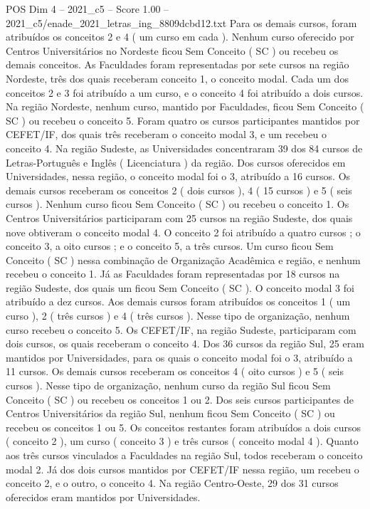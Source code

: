 \begin{textsample}{POS Dim 4 – 2021\_c5 – Score 1.00 – 2021\_c5/enade\_2021\_letras\_ing\_8809dcbd12.txt}
Para os demais cursos, foram atribuídos os conceitos 2 e 4 ( um curso em cada ).
Nenhum curso oferecido por Centros Universitários no Nordeste ficou Sem Conceito ( SC ) ou recebeu os demais conceitos.
As Faculdades foram representadas por sete cursos na região Nordeste, três dos quais receberam conceito 1, o conceito modal.
Cada um dos conceitos 2 e 3 foi atribuído a um curso, e o conceito 4 foi atribuído a dois cursos.
Na região Nordeste, nenhum curso, mantido por Faculdades, ficou Sem Conceito ( SC ) ou recebeu o conceito 5.
Foram quatro os cursos participantes mantidos por CEFET/IF, dos quais três receberam o conceito modal 3, e um recebeu o conceito 4.
Na região Sudeste, as Universidades concentraram 39 dos 84 cursos de Letras-Português e Inglês ( Licenciatura ) da região.
Dos cursos oferecidos em Universidades, nessa região, o conceito modal foi o 3, atribuído a 16 cursos.
Os demais cursos receberam os conceitos 2 ( dois cursos ), 4 ( 15 cursos ) e 5 ( seis cursos ).
Nenhum curso ficou Sem Conceito ( SC ) ou recebeu o conceito 1.
Os Centros Universitários participaram com 25 cursos na região Sudeste, dos quais nove obtiveram o conceito modal 4.
O conceito 2 foi atribuído a quatro cursos ; o conceito 3, a oito cursos ; e o conceito 5, a três cursos.
Um curso ficou Sem Conceito ( SC ) nessa combinação de Organização Acadêmica e região, e nenhum recebeu o conceito 1.
Já as Faculdades foram representadas por 18 cursos na região Sudeste, dos quais um ficou Sem Conceito ( SC ).
O conceito modal 3 foi atribuído a dez cursos.
Aos demais cursos foram atribuídos os conceitos 1 ( um curso ), 2 ( três cursos ) e 4 ( três cursos ).
Nesse tipo de organização, nenhum curso recebeu o conceito 5.
Os CEFET/IF, na região Sudeste, participaram com dois cursos, os quais receberam o conceito 4.
Dos 36 cursos da região Sul, 25 eram mantidos por Universidades, para os quais o conceito modal foi o 3, atribuído a 11 cursos.
Os demais cursos receberam os conceitos 4 ( oito cursos ) e 5 ( seis cursos ).
Nesse tipo de organização, nenhum curso da região Sul ficou Sem Conceito ( SC ) ou recebeu os conceitos 1 ou 2.
Dos seis cursos participantes de Centros Universitários da região Sul, nenhum ficou Sem Conceito ( SC ) ou recebeu os conceitos 1 ou 5.
Os conceitos restantes foram atribuídos a dois cursos ( conceito 2 ), um curso ( conceito 3 ) e três cursos ( conceito modal 4 ).
Quanto aos três cursos vinculados a Faculdades na região Sul, todos receberam o conceito modal 2.
Já dos dois cursos mantidos por CEFET/IF nessa região, um recebeu o conceito 2, e o outro, o conceito 4.
Na região Centro-Oeste, 29 dos 31 cursos oferecidos eram mantidos por Universidades.

\end{textsample}
